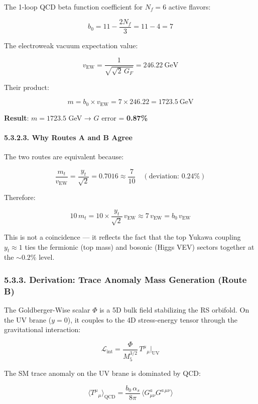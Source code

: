 \documentclass[
  11pt,
]{article}
\begin{document}
The 1-loop QCD beta function coefficient for \(N_f = 6\) active flavors:

\[b_0 = 11 - \frac{2N_f}{3} = 11 - 4 = 7 \tag{222}\]

The electroweak vacuum expectation value:

\[v_{\text{EW}} = \frac{1}{\sqrt{\sqrt{2}\,G_F}} = 246.22~\text{GeV} \tag{223}\]

Their product:

\[m = b_0 \times v_{\text{EW}} = 7 \times 246.22 = 1723.5~\text{GeV} \tag{224}\]

\textbf{Result}: \(m = 1723.5\) GeV → \(G\) error = \textbf{0.87\%}

\hypertarget{why-routes-a-and-b-agree}{%
\paragraph{5.3.2.3. Why Routes A and B
Agree}\label{why-routes-a-and-b-agree}}

The two routes are equivalent because:

\[\frac{m_t}{v_{\text{EW}}} = \frac{y_t}{\sqrt{2}} = 0.7016 \approx \frac{7}{10} \quad (\text{deviation: } 0.24\%) \tag{225}\]

Therefore:

\[10\,m_t = 10 \times \frac{y_t}{\sqrt{2}}\,v_{\text{EW}} \approx 7\,v_{\text{EW}} = b_0\,v_{\text{EW}} \tag{226}\]

This is not a coincidence --- it reflects the fact that the top Yukawa
coupling \(y_t \approx 1\) ties the fermionic (top mass) and bosonic
(Higgs VEV) sectors together at the \(\sim 0.2\%\) level.

\hypertarget{derivation-trace-anomaly-mass-generation-route-b}{%
\subsubsection{5.3.3. Derivation: Trace Anomaly Mass Generation (Route
B)}\label{derivation-trace-anomaly-mass-generation-route-b}}

The Goldberger-Wise scalar \(\Phi\) is a 5D bulk field stabilizing the
RS orbifold. On the UV brane (\(y = 0\)), it couples to the 4D
stress-energy tensor through the gravitational interaction:

\[\mathcal{L}_{\text{int}} = \frac{\Phi}{M_5^{3/2}}\,T^\mu{}_{\mu}\big|_{\text{UV}} \tag{227}\]

The SM trace anomaly on the UV brane is dominated by QCD:

\[\langle T^\mu{}_{\mu}\rangle_{\text{QCD}} = \frac{b_0\,\alpha_s}{8\pi}\,\langle G^a_{\mu\nu}G^{a\,\mu\nu}\rangle \tag{228}\]
\end{document}
